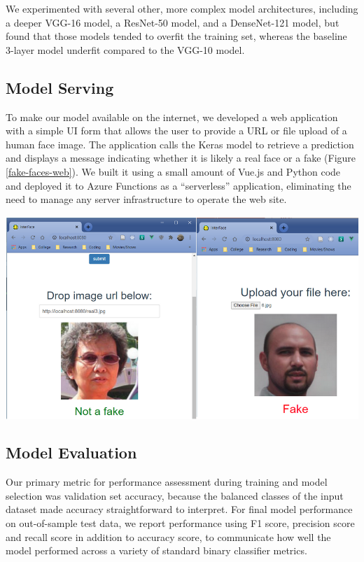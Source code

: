 \documentclass[11pt, letterpaper]{article}
\newenvironment{Figure}
  {\par\medskip\noindent\minipage{\linewidth}}
  {\endminipage\par\medskip}
\begin{document}
\begin{multicols}{2}
  We experimented with several other, more complex model
  architectures, including a deeper VGG-16 model, a ResNet-50 model,
  and a DenseNet-121 model, but found that those models tended to
  overfit the training set, whereas the baseline 3-layer model
  underfit compared to the VGG-10 model.

  \subsection{Model Serving}

  To make our model available on the internet, we developed a web
  application with a simple UI form that allows the user to provide a
  URL or file upload of a human face image.  The application calls the
  Keras model to retrieve a prediction and displays a message
  indicating whether it is likely a real face or a fake (Figure
  \ref{fake-faces-web}). We built it using a small amount of Vue.js
  and Python code and deployed it to Azure Functions as a
  ``serverless'' application, eliminating the need to manage any server
  infrastructure to operate the web site.

  \begin{Figure}
    \centering
    \includegraphics[width=1.0\textwidth]{figures/fake-faces-web.png}
    \label{fake-faces-web}
  \end{Figure}

  \subsection{Model Evaluation}

  Our primary metric for performance assessment during training and
  model selection was validation set accuracy, because the balanced
  classes of the input dataset made accuracy straightforward to
  interpret. For final model performance on out-of-sample test data,
  we report performance using F1 score, precision score and recall
  score in addition to accuracy score, to communicate how well the
  model performed across a variety of standard binary classifier
  metrics.


\end{multicols}
\end{document}
